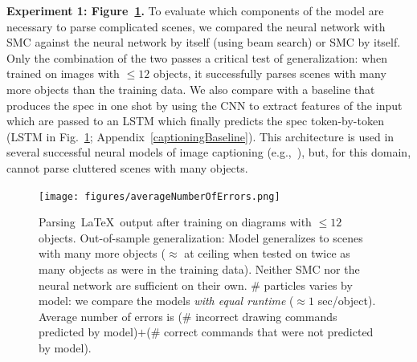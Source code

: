\documentclass{article}
\theoremstyle{definition}
\begin{document}
\textbf{Experiment 1: Figure~\ref{syntheticResults}.}
  To evaluate which components of the model are necessary to parse complicated scenes,
  we compared  the neural network
  with SMC against the neural network by
itself (using beam search) or SMC by itself.  Only the combination of the two passes a
critical test of generalization: when trained on images with $\leq 12$
objects, it successfully parses scenes with many more objects than the
training data.
We also compare with a baseline that produces the spec in one shot by
using the CNN to extract features of the input which are passed to an LSTM which finally predicts
the spec token-by-token (LSTM in Fig.~\ref{syntheticResults}; Appendix~\ref{captioningBaseline}).
This architecture is used in several successful neural models of image captioning (e.g.,~\cite{vinyals2015show}),
but, for this domain, cannot parse cluttered scenes with many objects.
\begin{figure}[h]\centering
  \begin{minipage}[c]{7cm}
      \texttt{[image: figures/averageNumberOfErrors.png]}    
  \end{minipage}\hspace{0.5cm}%
  \begin{minipage}[c]{6cm}
      \caption{Parsing~\LaTeX~output after training on diagrams with $\leq 12$ objects. Out-of-sample generalization: Model generalizes to scenes with many more objects ($\approx$ at ceiling when tested on twice as many objects as were in the training data). Neither SMC nor the neural network are sufficient on their own. \# particles varies by model: we compare the models \emph{with equal runtime} ($\approx 1$ sec/object). Average number of errors is (\# incorrect drawing commands predicted by model)$+$(\# correct commands that were not predicted by model).}\label{syntheticResults}
    \end{minipage}
  \end{figure}
\end{document}
